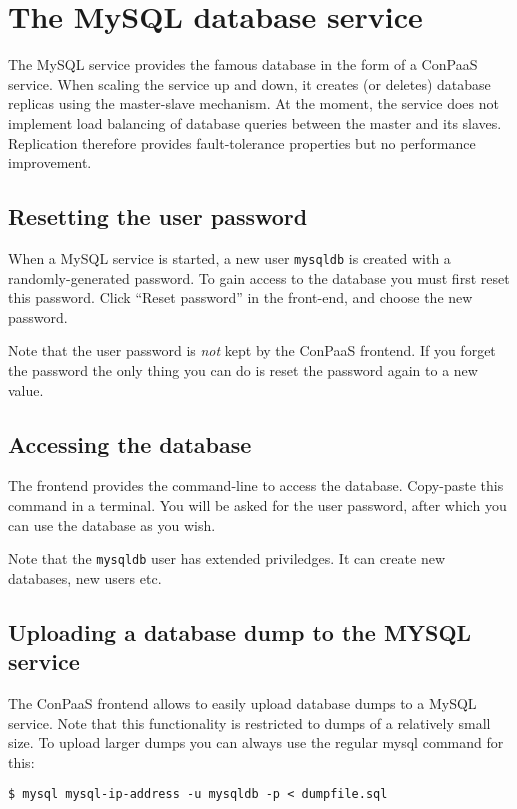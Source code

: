 \documentclass[10pt]{article}
\begin{document}
\section{The MySQL database service}

The MySQL service provides the famous database in the form of a
ConPaaS service. When scaling the service up and down, it creates (or
deletes) database replicas using the master-slave mechanism. At the
moment, the service does not implement load balancing of database
queries between the master and its slaves. Replication therefore
provides fault-tolerance properties but no performance improvement.

\subsection{Resetting the user password}

When a MySQL service is started, a new user \texttt{mysqldb} is
created with a randomly-generated password. To gain access to the
database you must first reset this password. Click ``Reset password''
in the front-end, and choose the new password.

Note that the user password is \emph{not} kept by the ConPaaS
frontend. If you forget the password the only thing you can do is
reset the password again to a new value.

\subsection{Accessing the database} 

The frontend provides the command-line to access the database.
Copy-paste this command in a terminal. You will be asked for the user
password, after which you can use the database as you wish.

Note that the \texttt{mysqldb} user has extended priviledges. It can
create new databases, new users etc.

\subsection{Uploading a database dump to the MYSQL service}

The ConPaaS frontend allows to easily upload database dumps to a MySQL service. Note that this functionality is restricted to dumps of a relatively small size. To upload larger dumps you can always use the regular mysql command for this:
\begin{verbatim}
$ mysql mysql-ip-address -u mysqldb -p < dumpfile.sql
\end{verbatim}
\end{document}
